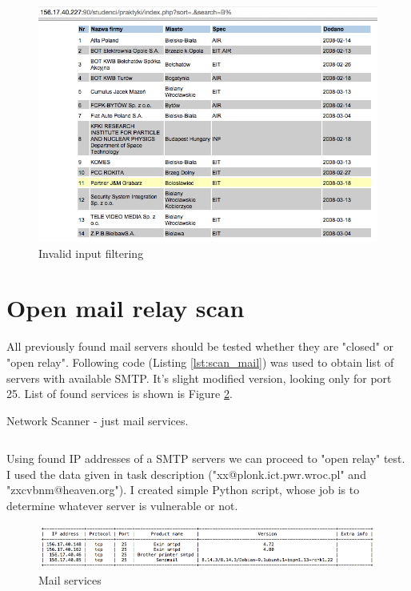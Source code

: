 \documentclass[a4paper, 11pt]{article}
\begin{document}
\begin{figure}[!htb]
  \centering
      \includegraphics[width=1\textwidth]{apache/sql_inject}
  \caption{Invalid input filtering}
  \label{fig:sql_inject}    
\end{figure}

\section*{Open mail relay scan}
All previously found mail servers should be tested whether they are "closed" or "open relay". 
Following code (Listing \ref{lst:scan_mail}) was used to obtain list of servers with available SMTP.
It's slight modified version, looking only for port 25. List of found services is shown is Figure \ref{fig:mail_scan}.

\begin{listing}[!htb]    
\caption{Network Scanner - just mail services.}    
\inputminted[mathescape, fontfamily=tt, frame=leftline,framerule=0.4pt,framesep=2mm]{python}{scripts/scan_mail.py}
\label{lst:scan_mail}    
\end{listing}

Using found IP addresses of a SMTP servers we can proceed to "open relay" test. I used the data given in task description ("xx@plonk.ict.pwr.wroc.pl" and "zxcvbnm@heaven.org"). I created simple Python script, whose job is to determine whatever server is vulnerable or not.

\begin{figure}[!htb]
  \centering
      \includegraphics[width=1\textwidth]{tables/mail_scan_all}
  \caption{Mail services}
  \label{fig:mail_scan}    
\end{figure}
\end{document}
